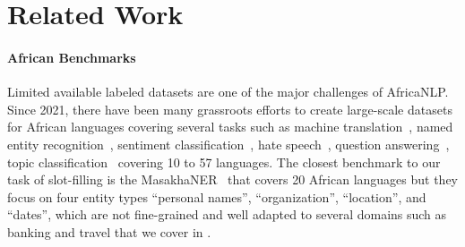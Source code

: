 \section{Related Work}

\paragraph{African Benchmarks}
Limited available labeled datasets are one of the major challenges of AfricaNLP. Since 2021, there have been many grassroots efforts to create large-scale datasets for African languages covering several tasks such as machine translation~\citep{Alabi2025}, named entity recognition~\citep{adelani-etal-2021-masakhaner,adelani-etal-2022-masakhaner}, sentiment classification~\citep{muhammad-etal-2023-afrisenti}, hate speech~\citep{Muhammad2025AfriHateAM}, question answering~\citep{ogundepo-etal-2023-cross}, topic classification~\citep{adelani-etal-2023-masakhanews,AfroXLM-76L} covering 10 to 57 languages. %
The closest benchmark to our task of slot-filling is the MasakhaNER~\citep{adelani-etal-2021-masakhaner,adelani-etal-2022-masakhaner} that covers 20 African languages but they focus on four entity types  ``personal names'', ``organization'', ``location'', and ``dates'', which are not fine-grained and well adapted to several domains such as banking and travel %
that we cover in \dataset{}. 




